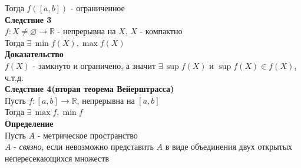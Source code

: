 \documentclass[12pt]{article}
\begin{document}
Тогда $f([a,b])$ - ограниченное\\
\textbf{Следствие 3}\\
$f:X\neq \varnothing\rightarrow \mathbb{R}$ - непрерывна на $X$, $X$ - компактно\\
Тогда $\exists\,\min f(X), \max f(X)$\\
\textbf{Доказательство}\\
$f(X)$ - замкнуто и ограничено, а значит $\exists\,\sup f(X)$ и $\sup f(X) \in f(X)$, ч.т.д.\\
\textbf{Следствие 4(вторая теорема Вейерштрасса)}\\
Пусть $f:[a,b] \rightarrow\mathbb{R}$, непрерывна на $[a,b]$\\
Тогда $\exists\,\max f,\min f$\\
\textbf{Определение}\\
Пусть $A$ - метрическое пространство\\
$A$ - \textit{связно}, если невозможно представить $A$ в виде объединения двух открытых непересекающихся множеств\\
\end{document}
